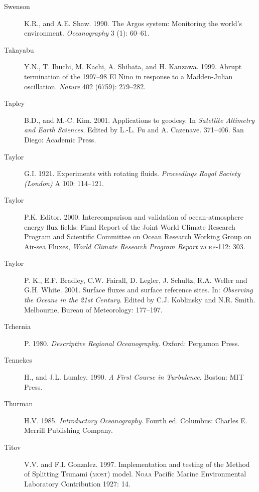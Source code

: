\begin{description}
\item [Swenson]K.R., and A.E. Shaw. 1990. The Argos system: Monitoring
  the world's environment. \textit{Oceanography} 3 (1): 60--61.

\item [Takayabu]Y.N., T. Ihuchi, M. Kachi, A. Shibata, and
  H. Kanzawa. 1999. Abrupt termination of the 1997--98 El Nino in
  response to a Madden-Julian oscillation. \textit{Nature} 402 (6759):
  279--282.

\item [Tapley]B.D., and M.-C. Kim. 2001. Applications to geodesy. In
  \textit{Satellite Altimetry and Earth Sciences}. Edited by L.-L. Fu
  and A.  Cazenave. 371--406. San Diego: Academic Press.

\item [Taylor]G.I. 1921. Experiments with rotating
  fluids. \textit{Proceedings Royal Society (London)} A 100: 114--121.

\item [Taylor]P.K. Editor. 2000. Intercomparison and validation of
  ocean-atmosphere energy flux fields: Final Report of the Joint World
  Climate Research Program and Scientific Committee on Ocean Research
  Working Group on Air-sea Fluxes, \textit{World Climate Research
    Program Report} \textsc{wcrp}-112: 303.

\item [Taylor]P. K., E.F. Bradley, C.W. Fairall, D. Legler,
  J. Schultz, R.A. Weller and G.H. White. 2001. Surface fluxes and
  surface reference sites. In: \textit{Observing the Oceans in the
    21st Century}. Edited by C.J. Koblinsky and N.R. Smith. Melbourne,
  Bureau of Meteorology: 177--197.

\item [Tchernia]P. 1980. \textit{Descriptive Regional
  Oceanography}. Oxford: Pergamon Press.

\item [Tennekes]H., and J.L. Lumley. 1990. \textit{A First Course in
  Turbulence}.  Boston: MIT Press.

\item [Thurman]H.V. 1985. \textit{Introductory Oceanography}. Fourth
  ed. Columbus: Charles E. Merrill Publishing Company.

\item [Titov]V.V. and F.I. Gonzalez. 1997. Implementation and testing
  of the Method of Splitting Tsunami (\textsc{most})
  model. \textsc{Noaa} Pacific Marine Environmental Laboratory
  Contribution 1927: 14.


\end{description}
